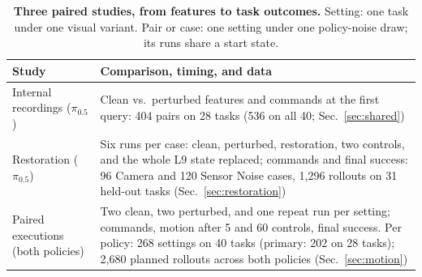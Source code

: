 \begin{table}[ht]
\caption{\textbf{Three paired studies, from features to task outcomes.} Setting: one task under one visual variant. Pair or case: one setting under one policy-noise draw; its runs share a start state.}
\label{tab:study-map}
\centering\small
\setlength{\tabcolsep}{3pt}
\begin{tabular}{@{}>{\raggedright\arraybackslash}p{}>{\raggedright\arraybackslash}p{}@{}}
\toprule
Study & Comparison, timing, and data\\\midrule
Internal recordings ($\pi_{0.5}$) & Clean vs.\ perturbed features and commands at the first query: 404 pairs on 28 tasks (536 on all 40; Sec.~\ref{sec:shared})\\\addlinespace[2pt]
Restoration ($\pi_{0.5}$) & Six runs per case: clean, perturbed, restoration, two controls, and the whole L9 state replaced; commands and final success: 96 Camera and 120 Sensor Noise cases, 1,296 rollouts on 31 held-out tasks (Sec.~\ref{sec:restoration})\\\addlinespace[2pt]
Paired executions (both policies) & Two clean, two perturbed, and one repeat run per setting; commands, motion after 5 and 60 controls, final success. Per policy: 268 settings on 40 tasks (primary: 202 on 28 tasks); 2,680 planned rollouts across both policies (Sec.~\ref{sec:motion})\\
\bottomrule
\end{tabular}
\end{table}
